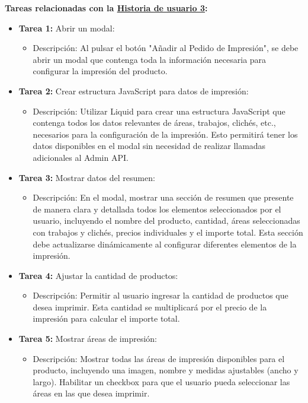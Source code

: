 \documentclass[12pt]{article}
\begin{document}
\textbf{Tareas relacionadas con la \hyperref[sec:historia3]{Historia de usuario 3}:}
\begin{itemize}
    \item \textbf{Tarea 1:} Abrir un modal:
          \begin{itemize}[label=--]
              \item Descripción: Al pulsar el botón "Añadir al Pedido de Impresión", se debe abrir un modal que contenga toda la información necesaria para configurar la impresión del producto.
          \end{itemize}
    \item \textbf{Tarea 2:} Crear estructura JavaScript para datos de impresión:
          \begin{itemize}[label=--]
              \item Descripción: Utilizar Liquid para crear una estructura JavaScript que contenga todos los datos relevantes de áreas, trabajos, clichés, etc., necesarios para la configuración de la impresión. Esto permitirá tener los datos disponibles en el modal sin necesidad de realizar llamadas adicionales al Admin API.
          \end{itemize}
    \item \textbf{Tarea 3:} Mostrar datos del resumen:
          \begin{itemize}[label=--]
              \item Descripción: En el modal, mostrar una sección de resumen que presente de manera clara y detallada todos los elementos seleccionados por el usuario, incluyendo el nombre del producto, cantidad, áreas seleccionadas con trabajos y clichés, precios individuales y el importe total. Esta sección debe actualizarse dinámicamente al configurar diferentes elementos de la impresión.
          \end{itemize}
    \item \textbf{Tarea 4:} Ajustar la cantidad de productos:
          \begin{itemize}[label=--]
              \item Descripción: Permitir al usuario ingresar la cantidad de productos que desea imprimir. Esta cantidad se multiplicará por el precio de la impresión para calcular el importe total.
          \end{itemize}
    \item \textbf{Tarea 5:} Mostrar áreas de impresión:
          \begin{itemize}[label=--]
              \item Descripción: Mostrar todas las áreas de impresión disponibles para el producto, incluyendo una imagen, nombre y medidas ajustables (ancho y largo). Habilitar un checkbox para que el usuario pueda seleccionar las áreas en las que desea imprimir.

\end{itemize}
\end{itemize}
\end{document}
